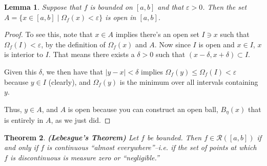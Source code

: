\documentclass[12pt]{article}
\theoremstyle{plain}
\newtheorem{thm}{Theorem}[subsection]
\newtheorem{lem}[thm]{Lemma}
\theoremstyle{definition}
\theoremstyle{remark}
\begin{document}
\begin{lem}
\label{leblem2}
Suppose that $f$ is bounded on $[a,b]$ and that $\varepsilon>0$. Then the set $A = \{x \in [a,b] \; | \; \Omega_f(x) < \varepsilon \}$ is open in $[a,b]$.
\end{lem}

\begin{proof}
To see this, note that $x\in A$ implies there's an open set $I\ni x$ such that $\Omega_f(I)<\varepsilon$, by the definition of $\Omega_f(x)$ and $A$.  Now since $I$ is open and $x\in I$, $x$ is interior to $I$. That means there exists a $\delta>0$ such that $(x-\delta, x+\delta)\subset I$. 

Given this $\delta$, we then have that $|y-x|<\delta$ implies $\Omega_f(y) \leq \Omega_f(I) < \varepsilon$ because $y\in I$ (clearly), and $\Omega_f(y)$ is the minimum over all intervals containing $y$. 

Thus, $y \in A$, and $A$ is open because you can construct an open ball, $B_\eta(x)$ that is entirely in $A$, as we just did.

\end{proof}

\begin{thm}
\emph{\textbf{(Lebesgue's Theorem)}}
Let $f$ be bounded. Then $f\in\mathscr{R}([a,b])$ if and only if $f$ is continuous ``almost everywhere''--i.e. if the set of points at which $f$ is discontinuous is measure zero or ``negligible.''
\end{thm}
\end{document}
